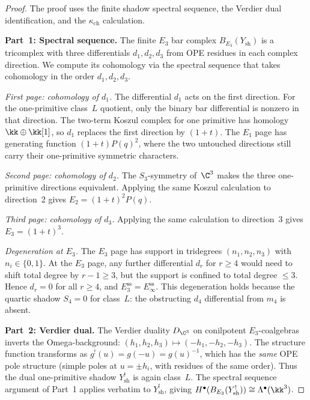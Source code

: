 \begin{proof}
The proof uses the finite shadow spectral sequence, the Verdier dual
identification, and the \(\kappa_{\mathrm{ch}}\) calculation.

\medskip
\noindent\textbf{Part~1: Spectral sequence.}
The finite $E_3$ bar complex \(B_{E_3}(Y_{\mathrm{sh}})\) is a
tricomplex with three differentials \(d_1,d_2,d_3\) from OPE residues
in each complex direction. We compute its cohomology via the spectral
sequence that takes cohomology in the order \(d_1,d_2,d_3\).

\emph{First page: cohomology of \(d_1\).}
The differential $d_1$ acts on the first direction. For the
one-primitive class~$L$ quotient, only the binary bar differential is
nonzero in that direction. The two-term Koszul complex for one primitive
has homology \(\kk\oplus \kk[1]\), so \(d_1\) replaces the first
direction by \((1+t)\). The \(E_1\) page has generating function
\((1+t)P(q)^2\), where the two untouched directions still carry their
one-primitive symmetric characters.

\emph{Second page: cohomology of \(d_2\).}
The \(S_3\)-symmetry of~\(\C^3\) makes the three one-primitive
directions equivalent. Applying the same Koszul calculation to
direction~2 gives \(E_2=(1+t)^2P(q)\).

\emph{Third page: cohomology of \(d_3\).}
Applying the same calculation to direction~3 gives \(E_3=(1+t)^3\).

\emph{Degeneration at \(E_3\).}
The $E_3$ page has support in tridegrees $(n_1, n_2, n_3)$ with $n_i \in \{0, 1\}$. At the $E_3$ page, any further differential $d_r$ for $r \geq 4$ would need to shift total degree by $r - 1 \geq 3$, but the support is confined to total degree $\leq 3$. Hence $d_r = 0$ for all $r \geq 4$, and $E^{\mathrm{ss}}_3 = E^{\mathrm{ss}}_\infty$. This degeneration holds because the quartic shadow $S_4 = 0$ for class~$L$: the obstructing $d_4$ differential from $m_4$ is absent.

\medskip
\noindent\textbf{Part~2: Verdier dual.}
The Verdier duality $D_{\C^3}$ on conilpotent $E_3$-coalgebras inverts the Omega-background: $(h_1, h_2, h_3) \mapsto (-h_1, -h_2, -h_3)$. The structure function transforms as $g^!(u) = g(-u) = g(u)^{-1}$, which has the \emph{same} OPE pole structure (simple poles at $u = \pm h_i$, with residues of the same order). Thus the dual one-primitive shadow \(Y_{\mathrm{sh}}^!\) is again class~$L$. The spectral sequence argument of Part~1 applies verbatim to \(Y_{\mathrm{sh}}^!\), giving \(H^\bullet(B_{E_3}(Y_{\mathrm{sh}}^!)) \cong \Lambda^\bullet(\kk^3)\).


\end{proof}
